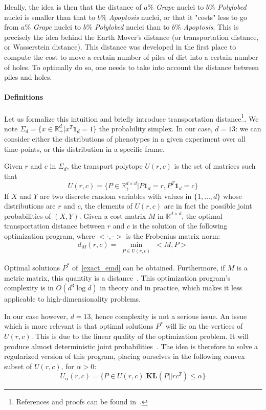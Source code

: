 Ideally, the idea is then that the distance of $a\%$ \textit{Grape}
nuclei to $b\%$ \textit{Polylobed} nuclei is smaller than that to
$b\%$ \textit{Apoptosis} nuclei, or that it "costs" less to go from
$a\%$ \textit{Grape} nuclei to $b\%$ \textit{Polylobed} nuclei
than to $b\%$ \textit{Apoptosis}. This is precisely the idea behind
the Earth Mover's distance (or transportation distance, or Wasserstein
distance). This distance was developed in the first place to compute the cost to move a certain number of piles of dirt into a certain number of holes. To optimally do so, one needs to take into account the
distance between piles and holes. 
\paragraph*{Definitions\\}
Let us formalize this intuition and briefly introduce transportation distance\footnote{References and proofs can be found in~\cite{sinkhorn}.}. We note $\Sigma_d = \{ x \in \mathbb{R}^d_+ | x^T \mathbf{1}_d = 1\}$ the probability simplex. In our case, $d=13$: we can consider either the distributions of phenotypes in a given experiment over all time-points, or this distribution in a specific frame.

Given $r$ and $c$ in $\Sigma_d$, the transport polytope $U(r,c)$ is the set of matrices such that 
\[
U(r,c)=\{ P\in \mathbb{R}^{d\times d}_+ | P\mathbf{1}_d = r, P^T \mathbf{1}_d = c \}\] 
If $X$ and $Y$ are two discrete random variables with values in $ \{1,\ldots , d\} $ whose distributions are $r$ and $c$, the elements of $U(r,c)$ are in fact the possible joint probabilities of $\left( X,Y\right)$. Given a cost matrix $M$ in $\mathbb{R}^{d\times d}$, the optimal transportation distance between $r$ and $c$ is the solution of the following optimization program, where $<\cdot, \cdot> $ is the Frobenius matrix norm:
\begin{equation}
d_M(r,c) = \min_{\substack{P\in U(r,c)}} <M,P>
\label{exact_emd}
\end{equation}

Optimal solutions $P^*$ of~\ref{exact_emd} can be obtained. Furthermore, if $M$ is a metric matrix, this quantity is a distance~\cite{Villani}. This optimization program's complexity is in $O\left( d^3\log d\right) $ in theory and in practice, which makes it less applicable to high-dimensionality problems. 

In our case however, $d=13$, hence complexity is not a serious issue. An issue which is more relevant is that optimal solutions $P^*$ will lie on the vertices of $U(r,c)$. This is due to the linear quality of the optimization problem. It will produce almost deterministic joint probabilities~\cite{sinkhorn}. The idea is therefore to solve a regularized version of this program, placing ourselves in the following convex subset of $U(r,c)$, for $\alpha >0$:
\[
U_\alpha\left( r, c\right) = \{ P \in U\left( r,c \right) | \mathbf{KL}\left(P || rc^T\right)\leqslant \alpha\}
\]

